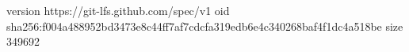 version https://git-lfs.github.com/spec/v1
oid sha256:f004a488952bd3473e8c44ff7af7cdcfa319edb6e4c340268baf4f1dc4a518be
size 349692
